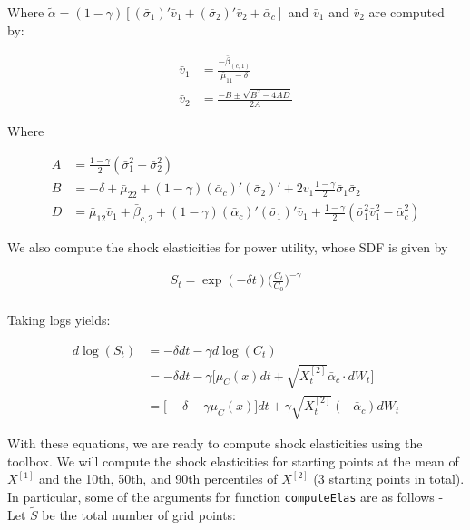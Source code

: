 \documentclass[12pt]{article}
\begin{document}
Where $\tilde{\alpha} = (1 - \gamma) [(\bar{\sigma}_1)'\bar{v}_1 + (\bar{\sigma}_2)'\bar{v}_2 + \bar{\alpha}_c ]$ and $\bar{v}_1$ and $\bar{v}_2$ are computed by:

\begin{align*}
\bar{v}_1 &= \frac{-\bar{\beta}_{(c,1)}}{\bar{\mu}_{11} - \delta} \\
\bar{v}_2 &= \frac{{ - B \pm \sqrt {B^2 - 4AD} }}{{2A}}
\end{align*}

Where

\begin{align*}
A &= \frac{1 - \gamma}{2} (\bar{\sigma}^2_1 +  \bar{\sigma}^2_2) \\
B &= -\delta + \bar{\mu}_{22} + (1 - \gamma) ( \bar{\alpha}_c )' (\bar{\sigma}_2)' + 2 v_1 \frac{1 - \gamma}{2} \bar{\sigma}_1 \bar{\sigma}_2 \\
D &= \bar{\mu}_{12} \bar{v}_1 + \bar{\beta	}_{c,2} + (1 - \gamma)  ( \bar{\alpha}_c )' (\bar{\sigma}_1)'\bar{v}_1 + \frac{1 - \gamma}{2} ( \bar{\sigma}^{2}_1 \bar{v}^{2}_1 - \bar{\alpha}_c^2)
\end{align*}

We also compute the shock elasticities for power utility, whose SDF is given by

\begin{align*}
S_t = \exp{(-\delta t)} \bigg( \frac{C_t}{C_0} \bigg)^{-\gamma}
\end{align*} \\

Taking logs yields:

\begin{align*}
d\log(S_t) &= -\delta dt - \gamma d\log(C_t)  \\
&= -\delta dt - \gamma \bigg[ \mu_C(x)dt + \sqrt{X^{[2]}_t} \bar{\alpha}_c \cdot dW_t  \bigg] \\
&= \bigg[ -\delta - \gamma \mu_C(x) \bigg] dt + \gamma \sqrt{X^{[2]}_t} (- \bar{\alpha}_c) dW_t
\end{align*}

With these equations, we are ready to compute shock elasticities using the toolbox. We will compute the shock elasticities for starting points at the mean of $X^{[1]}$ and the 10th, 50th, and 90th percentiles of $X^{[2]}$ (3 starting points in total). In particular, some of the arguments for function \texttt{computeElas} are as follows - \\

Let $\tilde{S}$ be the total number of grid points:
\end{document}
